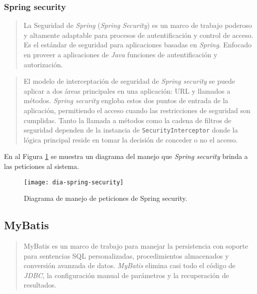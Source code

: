 \subsubsection{Spring security}\label{sec:spring-security}
\begin{quote}
	La Seguridad de \textit{Spring} (\textit{Spring Security}) es un marco de trabajo poderoso y altamente adaptable para procesos de autentificación y control de acceso. Es el estándar de seguridad para aplicaciones basadas en \textit{Spring}. Enfocado en proveer a aplicaciones de \textit{Java} funciones de autentificación y autorización\cite{SpringSecurity}.
\end{quote}

\begin{quote}
	El modelo de interceptación de seguridad de \textit{Spring security} se puede aplicar a dos áreas principales en una aplicación: URL y llamados a métodos. \textit{Spring security} engloba estos dos puntos de entrada de la aplicación, permitiendo el acceso cuando las restricciones de seguridad son cumplidas. Tanto la llamada a métodos como la cadena de filtros de seguridad dependen de la instancia de \texttt{SecurityInterceptor} donde la lógica principal reside en tomar la decisión de conceder o no el acceso\cite{ProSpringSecurity}.
\end{quote}
En al Figura \ref{fig:dia-spring-security} se muestra un diagrama del manejo que \textit{Spring security} brinda a las peticiones al sistema.

\begin{figure}[h]
	\centering
	\texttt{[image: dia-spring-security]}
	\caption{Diagrama de manejo de peticiones de Spring security\cite{ProSpringSecurity}.}
	\label{fig:dia-spring-security}
\end{figure}

\subsection{MyBatis}\label{sec:mybatis}
\begin{quote}
MyBatis es un marco de trabajo para manejar la persistencia con soporte para sentencias SQL personalizadas, procedimientos almacenados y conversión avanzada de datos. \textit{MyBatis} elimina casi todo el código de \textit{JDBC}, la configuración manual de parámetros y la recuperación de resultados\cite{MyBatis}.
\end{quote}

